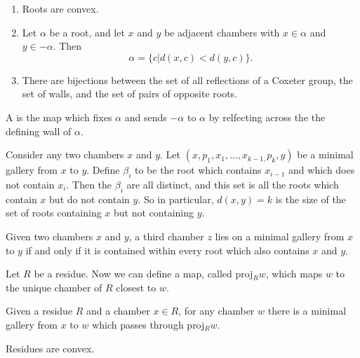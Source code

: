 \documentclass[11pt]{article}
\begin{document}
\begin{proposition}
    \begin{enumerate}
        \item Roots are convex.
        \item Let $\alpha$ be a root, and let $x$ and $y$ be adjacent chambers with $x\in\alpha$ and $y\in -\alpha$. Then
        \[\alpha =\{c|d(x,c)<d(y,c)\}.\]
        \item There are bijections between the set of all reflections of a Coxeter group, the set of walls, and the set of pairs of opposite roots.
    \end{enumerate}
\end{proposition}

\begin{definition}\label{fold}
    A  is the map which fixes $\alpha$ and sends $-\alpha$ to $\alpha$ by relfecting across the the defining wall of $\alpha$. 
\end{definition}

\begin{proposition}
    Consider any two chambers $x$ and $y$. Let $(x,p_1,x_1,...,x_{k-1,}p_k,y)$ be a minimal gallery from $x$ to $y$. Define $\beta_i$ to be the root which contains $x_{i-1}$ and which does not contain $x_i$. Then the $\beta_i$ are all distinct, and this set is all the roots which contain $x$ but do not contain $y$. So in particular, $d(x,y)=k$ is the size of the set of roots containing $x$ but not containing $y$. 
\end{proposition}

\begin{proposition}
    Given two chambers $x$ and $y$, a third chamber $z$ lies on a minimal gallery from $x$ to $y$ if and only if it is contained within every root which also contains $x$ and $y$. 
\end{proposition}


Let $R$ be a residue. Now we can define a map, called proj$_Rw$, which maps $w$ to the unique chamber of $R$ closest to $w$. 


\begin{proposition}
    Given a residue $R$ and a chamber $x\in R$, for any chamber $w$ there is a minimal gallery from $x$ to $w$ which passes through proj$_Rw$. 
\end{proposition}

\begin{lemma}
    Residues are convex.
\end{lemma}
\end{document}
